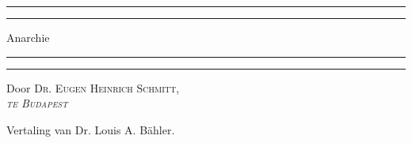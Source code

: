 \documentclass[a4paper, 12pt, oneside, dutch]{article}
\begin{document}
\begin{titlepage} %
	\centering %
	\scshape %

	
	\rule{\textwidth}{1.6pt}\vspace*{-\baselineskip}\vspace*{2pt} %
	\rule{\textwidth}{0.4pt} %
	
	\vspace{0.75\baselineskip} %

        {\Huge Anarchie \\} %
	
	\vspace{0.75\baselineskip} %
	
	\rule{\textwidth}{0.4pt}\vspace*{-\baselineskip}\vspace{3.2pt} %
	\rule{\textwidth}{1.6pt} %
	
	\vspace{1\baselineskip} %
	
	
	{Door \scshape\Large Dr. Eugen Heinrich Schmitt,\\\emph{te Budapest} \\} %
	
	\vspace*{1\baselineskip} %
	


	\vspace{1\baselineskip} %

        {\small Vertaling van Dr. Louis A. Bähler.}

	

\end{titlepage}
\end{document}
